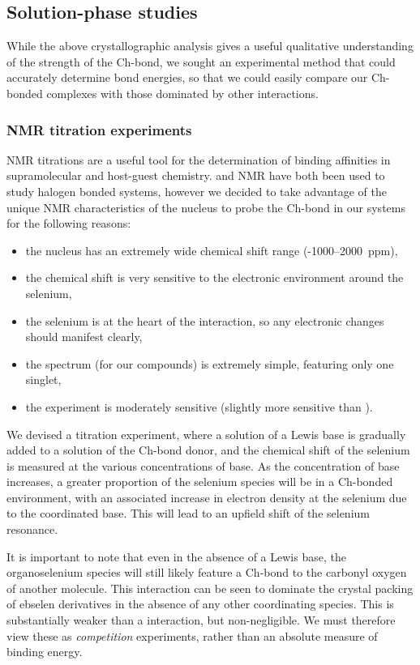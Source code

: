 \subsection{Solution-phase studies}
While the above crystallographic analysis gives a useful qualitative understanding of the strength of the Ch-bond, we sought an experimental method that could accurately determine bond energies, so that we could easily compare our Ch-bonded complexes with those dominated by other interactions.

\subsubsection{NMR titration experiments}
NMR titrations are a useful tool for the determination of binding affinities in supramolecular and host-guest chemistry.
 and  NMR have both been used to study halogen bonded systems, however we decided to take advantage of the unique NMR characteristics of the  nucleus to probe the Ch-bond in our systems for the following reasons:

\begin{itemize}
    \item the nucleus has an extremely wide chemical shift range (-1000--2000~ppm),
    \item the chemical shift is very sensitive to the electronic environment around the selenium,
    \item the selenium is at the heart of the interaction, so any electronic changes should manifest clearly,
    \item the spectrum (for our compounds) is extremely simple, featuring only one singlet,
    \item the experiment is moderately sensitive (slightly more sensitive than ).
\end{itemize}

We devised a titration experiment, where a solution of a Lewis base is gradually added to a solution of the Ch-bond donor, and the chemical shift of the selenium is measured at the various concentrations of base.
As the concentration of base increases, a greater proportion of the selenium species will be in a Ch-bonded environment, with an associated increase in electron density at the selenium due to the coordinated base.
This will lead to an upfield shift of the selenium resonance.

It is important to note that even in the absence of a Lewis base, the organoselenium species will still likely feature a Ch-bond to the carbonyl oxygen of another molecule.
This interaction can be seen to dominate the crystal packing of ebselen derivatives in the absence of any other coordinating species.
This is substantially weaker than a  interaction, but non-negligible.
We must therefore view these as \emph{competition} experiments, rather than an absolute measure of binding energy.


